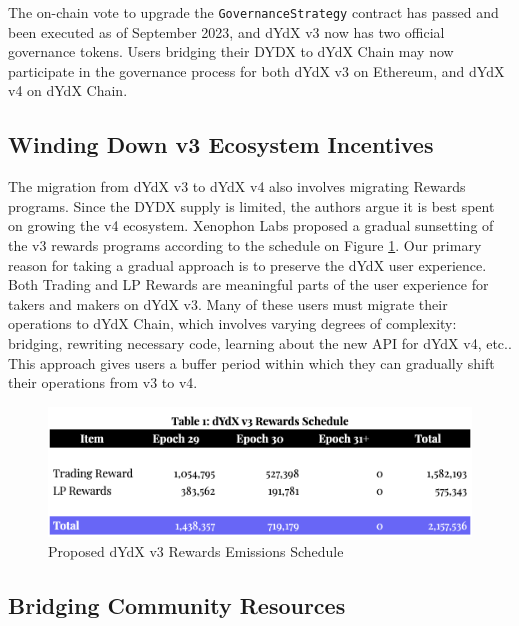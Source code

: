         The on-chain vote to upgrade the \texttt{GovernanceStrategy} contract has passed and been executed as of September 2023, and dYdX v3 now has two official governance tokens. Users bridging their DYDX to dYdX Chain may now participate in the governance process for both dYdX v3 on Ethereum, and dYdX v4 on dYdX Chain.

    \subsection{Winding Down v3 Ecosystem Incentives}

        The migration from dYdX v3 to dYdX v4 also involves migrating Rewards programs. Since the DYDX supply is limited, the authors argue it is best spent on growing the v4 ecosystem. Xenophon Labs proposed a gradual sunsetting of the v3 rewards programs according to the schedule on Figure \ref{fig:winddown}. Our primary reason for taking a gradual approach is to preserve the dYdX user experience. Both Trading and LP Rewards are meaningful parts of the user experience for takers and makers on dYdX v3. Many of these users must migrate their operations to dYdX Chain, which involves varying degrees of complexity: bridging, rewriting necessary code, learning about the new API for dYdX v4, etc.. This approach gives users a buffer period within which they can gradually shift their operations from v3 to v4.

        \begin{figure}[htp]
            \centering
            \includegraphics[width=\linewidth]{figs/winddown.png}
            \caption{Proposed dYdX v3 Rewards Emissions Schedule}
            \label{fig:winddown}
        \end{figure}
    
    \subsection{Bridging Community Resources}

